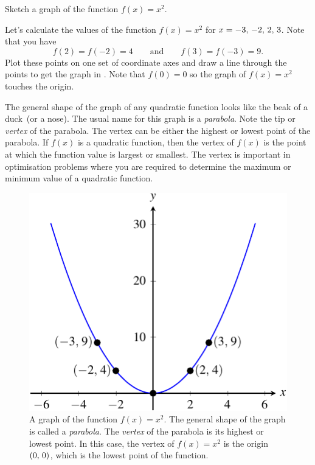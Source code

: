 \documentclass[a4paper,oneside,12pt]{article}
\begin{document}
\begin{example}
Sketch a graph of the function $f(x) = x^2$.
\end{example}

\begin{solution}
Let's calculate the values of the function $f(x) = x^2$ for
$x = {-3},\, {-2},\, {2},\, {3}$.  Note that you have
\[
f(2) = f(-2) = 4
\qquad
\text{and}
\qquad
f(3) = f(-3) = 9.
\]
Plot these points on one set of coordinate axes and draw a line
through the points to get the graph in .
Note that $f(0) = 0$ so the graph of $f(x) = x^2$ touches the origin.
\end{solution}

The general shape of the graph of any quadratic function looks like
the beak of a duck~(or a nose).  The usual name for this graph is a
\emph{parabola}.  Note the tip or \emph{vertex} of the parabola.  The
vertex can be either the highest or lowest point of the parabola.  If
$f(x)$ is a quadratic function, then the vertex of $f(x)$ is the point
at which the function value is largest or smallest.  The vertex is
important in optimisation problems where you are required to determine
the maximum or minimum value of a quadratic function.

\begin{figure}[!htbp]
\centering
\includegraphics[scale=1.2]{image/08/a-1.pdf}
\caption{%
  A graph of the function $f(x) = x^2$.  The general shape of the
  graph is called a \emph{parabola}.  The \emph{vertex} of the
  parabola is its highest or lowest point.  In this case, the vertex
  of $f(x) = x^2$ is the origin $\left\lparen{0},\, {0}\right\rparen$, which is the lowest
  point of the function.
}
\label{fig:quadratic_a_1}
\end{figure}
\end{document}
